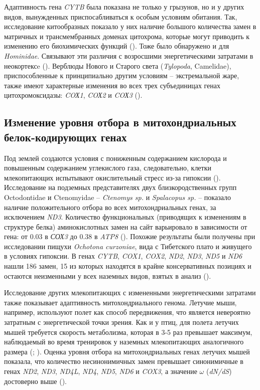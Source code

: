 Адаптивность гена \textit{CYTB} была показана не только у грызунов, но и у других видов, вынужденных приспосабливаться к особым условиям обитания. Так, исследование китообразных показало у них наличие большого количества замен в матричных и трансмембранных доменах цитохрома, которые могут приводить к изменению его биохимических функций (\cite{McClellan2005}). Тоже было обнаружено и для \textit{Hominidae}. Связывают эти различия с возросшими энергетическими затратами в неокортексe (\cite{Adkins1994}). Верблюды Нового и Старого света (\textit{Tylopoda}, Camelidae), приспособленные к принципиально другим условиям -- экстремальной жаре, также имеют характерные изменения во всех трех субъединицах генах цитохромоксидазы: \textit{COХ1}, \textit{COХ2} и \textit{COХ3} (\cite{DiRocco2006}). 

\subsection{Изменение уровня отбора в митохондриальных белок-кодирующих генах}

Под землей создаются условия с пониженным содержанием кислорода и повышенным содержанием углекислого газа, следовательно, клетки млекопитающих испытывают окислительный стресс из-за гипоксии (\cite{Dirmeier2002}). Исследование на подземных представителях двух близкородственных групп Octodontidae и Ctenomyidae -- \textit{Ctenomys sp.} и \textit{Spalacopus sp.} -- показало наличие положительного отбора во всех митохондриальных генах, за исключением \textit{ND3}. Количество функциональных (приводящих к изменениям в структуре белка) аминокислотных замен на сайт варьировало в зависимости от гена: от 0.03 в \textit{СОХ3} до 0.38 в \textit{ATP8} (\cite{Tomasco2011}). Похожие результаты были получены при исследовании пищухи \textit{Ochotona curzoniae}, вида с Тибетского плато и живущего в условиях гипоксии. В генах \textit{CYTB}, \textit{COX1}, \textit{COX2}, \textit{ND2}, \textit{ND3}, \textit{ND5} и \textit{ND6} нашли 186 замен, 15 из которых находятся в крайне консервативных позициях и остаются неизменными у всех наземных видов, взятых в анализ (\cite{Luo2008}). 

Исследование других млекопитающих с измененными энергетическими затратами также показывает адаптивность митохондриального генома. Летучие мыши, например, используют полет как способ передвижения, что является невероятно затратным с энергетической точки зрения. Как и у птиц, для полета летучих мышей требуется скорость метаболизма, которая в 3-5 раз превышает максимум, наблюдаемый во время тренировок у наземных млекопитающих аналогичного размера (\cite{THOMASSTEVENP.SUTHERS1972}; \cite{Maina2000}).  Оценка уровня отбора на митохондриальных генах летучих мышей показала, что количество несинонимичных замен превышает синонимичные в генах  \textit{ND2}, \textit{ND3}, \textit{ND4L}, \textit{ND4}, \textit{ND5}, \textit{ND6} и \textit{COX3}, а значение $\omega$ (\textit{dN/dS}) достоверно выше (\cite{Shen2010}). 

